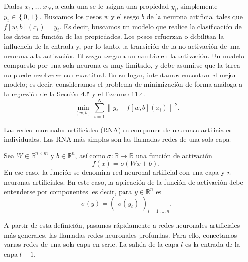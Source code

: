 \begin{frame}
    Dados $x_{1},\dotsc,x_{N}$, a cada una se le asigna una propiedad
    $y_{i}$, simplemente $y_{i}\in\left\{0,1\right\}$.
    Buscamos los pesos $w$ y el sesgo $b$ de la neurona artificial
    tales que $f\left[w,b\right](x_{i})=y_{i}$.
    Es decir, buscamos un modelo que realice la clasificación de los
    datos en función de las propiedades.
    Los pesos refuerzan o debilitan la influencia de la entrada y, por
    lo tanto, la transición de la no activación de una neurona a la
    activación.
    El sesgo asegura un cambio en la activación.
    Un modelo compuesto por una sola neurona es muy limitado, y debe
    asumirse que la tarea no puede resolverse con exactitud.
    En su lugar, intentamos encontrar el mejor modelo; es decir,
    consideramos el problema de minimización de forma análoga a la
    regresión de la Sección 4.5 y el Excurso 11.4.
    \begin{equation*}
        \min_{\left(w,b\right)}
        \sum_{i=1}^{N}
        {\left\|y_{i}-f\left[w,b\right]\left(x_{i}\right)\right\|}^{2}.
    \end{equation*}

    \pause

    Las redes neuronales artificiales (RNA) se componen de neuronas
    artificiales individuales.
    Las RNA más simples son las llamadas redes de una sola capa:

    \begin{definition}
        Sea $W\in\mathbb{R}^{n\times m}$ y $b\in\mathbb{R}^{n}$, así como
        $\sigma\colon\mathbb{R}\to\mathbb{R}$ una función de activación.
        \vspace*{-.5\baselineskip}\setlength\belowdisplayshortskip{0pt}
        \begin{equation*}
            f\left(x\right)=
            \sigma\left(Wx+b\right),
        \end{equation*}
        En ese caso, la función se denomina red neuronal artificial con
        una capa y $n$ neuronas artificiales.
        En este caso, la aplicación de la función de activación debe
        entenderse por componentes, es decir, para $y\in\mathbb{R}^{n}$
        es
        \begin{equation*}
            \sigma\left(y\right)=
            {\begin{pmatrix}
                \sigma\left(y_{i}\right)
            \end{pmatrix}}_{i=1,\dotsc,n}.
        \end{equation*}
    \end{definition}
    A partir de esta definición, pasamos rápidamente a redes neuronales
    artificiales más generales, las llamadas redes neuronales
    profundas.
    Para ello, conectamos varias redes de una sola capa en serie.
    La salida de la capa $l$ es la entrada de la capa $l+1$.
\end{frame}


